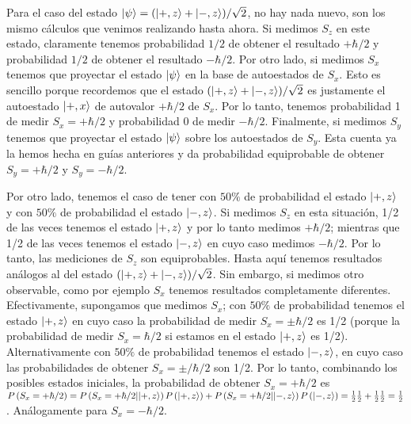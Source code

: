 \documentclass[10pt, a4paper]{article}
\numberwithin{equation}{subsection}
\begin{document}
Para el caso del estado $\ket{\psi} = (\ket{+,z} + \ket{-,z})/\sqrt{2}$, no hay
nada nuevo, son los mismo cálculos que venimos realizando hasta ahora. Si
medimos $S_z$ en este estado, claramente tenemos probabilidad $1/2$ de obtener
el resultado $+\hbar/2$ y probabilidad $1/2$ de obtener el resultado
$-\hbar/2$. Por otro lado, si medimos $S_x$ tenemos que proyectar el estado
$\ket{\psi}$ en la base de autoestados de $S_x$. Esto es sencillo porque
recordemos que el estado $(\ket{+,z} + \ket{-,z})/\sqrt{2}$ es justamente el
autoestado $\ket{+,x}$ de autovalor $+\hbar/2$ de $S_x$. Por lo tanto, tenemos
probabilidad 1 de medir $S_x = +\hbar/2$ y probabilidad 0 de medir $-\hbar/2$.
Finalmente, si medimos $S_y$ tenemos que proyectar el estado $\ket{\psi}$ sobre
los autoestados de $S_y$. Esta cuenta ya la hemos hecha en guías anteriores y
da probabilidad equiprobable de obtener $S_y=+\hbar/2$ y $S_y=-\hbar/2$.

Por otro lado, tenemos el caso de tener con $50\%$ de probabilidad el estado
$\ket{+,z}$ y con $50\%$ de probabilidad el estado $\ket{-,z}$. Si medimos
$S_z$ en esta situación, 1/2 de las veces tenemos el estado $\ket{+,z}$ y por
lo tanto medimos $+\hbar/2$; mientras que 1/2 de las veces tenemos el estado
$\ket{-,z}$ en cuyo caso medimos $-\hbar/2$. Por lo tanto, las mediciones de
$S_z$ son equiprobables. Hasta aquí tenemos resultados análogos al del estado
$(\ket{+,z} + \ket{-,z})/\sqrt{2}$. Sin embargo, si medimos otro observable,
como por ejemplo $S_x$ tenemos resultados completamente diferentes.
Efectivamente, supongamos que medimos $S_x$; con $50\%$ de probabilidad tenemos
el estado $\ket{+,z}$ en cuyo caso la probabilidad de medir $S_x=\pm\hbar/2$ es
1/2 (porque la probabilidad de medir $S_x=\hbar/2$ si estamos en el estado
$\ket{+,z}$ es 1/2). Alternativamente con $50\%$ de probabilidad tenemos el
estado $\ket{-,z}$, en cuyo caso las probabilidades de obtener
$S_x=\pm/\hbar/2$ son 1/2. Por lo tanto, combinando los posibles estados
iniciales, la probabilidad de obtener $S_x=+\hbar/2$ es
$P\left({S_x=+\hbar/2}\right) = P\left({S_x=+\hbar/2}\middle|{\ket{+,z}}\right)P\left({\ket{+,z}}\right) +
P\left({S_x=+\hbar/2}\middle|{\ket{-,z}}\right)P\left({\ket{-,z}}\right) = \frac{1}{2}\frac{1}{2} +
\frac{1}{2}\frac{1}{2} = \frac{1}{2}$. Análogamente para $S_x=-\hbar/2$.
\end{document}
